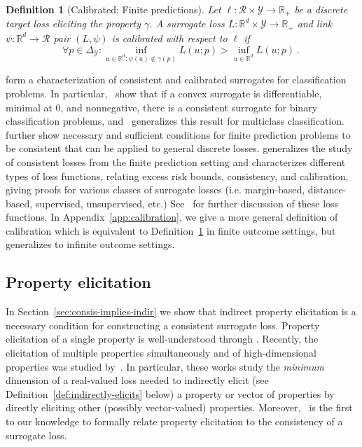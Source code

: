 \documentclass{article}
\newcommand{\reals}{\mathbb{R}}
\newcommand{\simplex}{\Delta_\Y}
\newcommand{\R}{\mathcal{R}}
\newcommand{\Y}{\mathcal{Y}}
\newtheorem{definition}{Definition}
\begin{document}
\begin{definition}[Calibrated: Finite predictions]\label{def:calibrated-finite}
	Let $\ell : \R \times \Y \to \reals_+$ be a discrete target loss eliciting the property $\gamma$.
	A surrogate loss $L : \reals^d \times \Y \to \reals_+$  and link $\psi:\reals^d \to \R$ pair $(L, \psi)$ is \emph{calibrated} with respect to $\ell$ if 
	\begin{equation}\label{eq:calibration}
	\forall p \in \simplex: \inf_{u \in \reals^d : \psi(u) \not \in \gamma(p)} L(u;p) > \inf_{u \in \reals^d} L(u;p)~.~
	\end{equation}
\end{definition}

\cite{zhang2004statistical,lin2004note,bartlett2006convexity,tewari2007consistency} form a characterization of consistent and calibrated surrogates for classification problems.
In particular,~\cite{bartlett2006convexity} show that if a convex surrogate is differentiable, minimal at $0$, and nonnegative, there is a consistent surrogate for binary classification problems, and~\cite{tewari2007consistency} generalizes this result for multiclass classification. 
\cite{ramaswamy2016convex} further show necessary and sufficient conditions for finite prediction problems to be consistent that can be applied to general discrete losses.
\cite{steinwart2007compare} generalizes the study of consistent losses from the finite prediction setting and characterizes different types of loss functions, relating excess risk bounds, consistency, and calibration, giving proofs for various classes of surrogate losses (i.e. margin-based, distance-based, supervised, unsupervised, etc.)
See~\cite[Chapter 2]{steinwart2008support} for further discussion of these loss functions.
In Appendix~\ref{app:calibration}, we give a more general definition of calibration which is equivalent to Definition~\ref{def:calibrated-finite} in finite outcome settings, but generalizes to infinite outcome settings.


\subsection{Property elicitation}\label{subsec:properties}
In Section~\ref{sec:consis-implies-indir} we show that indirect property elicitation is a necessary condition for constructing a consistent surrogate loss.
Property elicitation of a single property is well-understood through \cite{savage1971elicitation,osband1985information-eliciting,lambert2008eliciting, lambert2009eliciting, lambert2018elicitation}.
Recently, the elicitation of multiple properties simultaneously and of high-dimensional properties was studied by~\cite{frongillo2015vector-valued,fissler2015higher,frongillo2018elicitation}.
In particular, these works study the \emph{minimum} dimension of a real-valued loss needed to indirectly elicit (see Definition~\ref{def:indirectly-elicits} below) a property or vector of properties by directly eliciting other (possibly vector-valued) properties.
Moreover,~\cite{agarwal2015consistent} is the first to our knowledge to formally relate property elicitation to the consistency of a surrogate loss.
\end{document}
